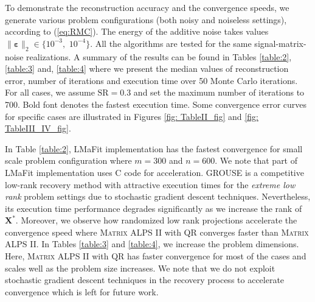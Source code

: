 \documentclass[twocolumn]{svjour3}
\newcommand{\vectornormbig}[1]{\big\|#1\big\|}
\newcommand{\bestsignal}{\boldsymbol{X}^\ast}
\newcommand{\noise}{\boldsymbol{\varepsilon}}
\begin{document}
To demonstrate the reconstruction accuracy and the convergence speeds, we generate various problem configurations (both noisy and noiseless settings), according to (\ref{eq:RMC}). The energy of the additive noise takes values $\vectornormbig{\noise}_2 \in \lbrace 10^{-3}, $ $10^{-4} \rbrace $. All the algorithms are tested for the same signal-matrix-noise realizations. A summary of the results can be found in Tables \ref{table:2}, \ref{table:3} and, \ref{table:4} where we present the median values of reconstruction error, number of iterations and execution time over 50 Monte Carlo iterations. For all cases, we assume $\text{SR} = 0.3 $ and set the maximum number of iterations to 700. Bold font denotes the fastest execution time. Some convergence error curves for specific cases are illustrated in Figures \ref{fig: TableII_fig} and \ref{fig: TableIII_IV_fig}.

In Table \ref{table:2}, LMaFit \cite{LMatFit} implementation has the fastest convergence for small scale problem configuration where $m = 300 $ and $n = 600$. We note that part of LMaFit implementation uses C code for acceleration. GROUSE \cite{GROUSE} is a competitive low-rank recovery method with attractive execution times for the {\it extreme low rank} problem settings due to stochastic gradient descent techniques. Nevertheless, its execution time performance degrades significantly as we increase the rank of $\bestsignal$. Moreover, we observe how randomized low rank projections accelerate the convergence speed where \textsc{Matrix ALPS II} with QR converges faster than \textsc{Matrix ALPS II}. In Tables \ref{table:3} and \ref{table:4}, we increase the problem dimensions. Here, \textsc{Matrix ALPS II} with QR has faster convergence for most of the cases and scales well as the problem size increases. We note that we do not exploit stochastic gradient descent techniques in the recovery process to accelerate convergence which is left for future work.
\end{document}
